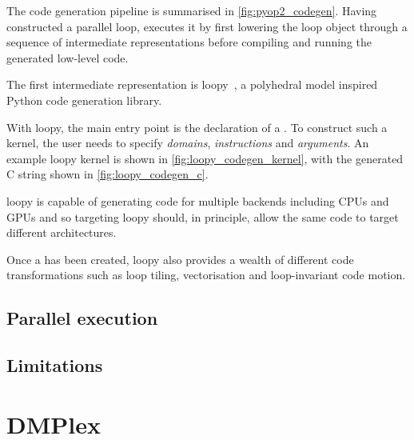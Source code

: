 \documentclass[thesis]{subfiles}
\begin{document}
The code generation pipeline is summarised in \cref{fig:pyop2_codegen}.
Having constructed a parallel loop,  executes it by first lowering the loop object through a sequence of intermediate representations before compiling and running the generated low-level code.

The first intermediate representation is loopy~\cite{klocknerLooPyTransformationbased2014}, a polyhedral model inspired Python code generation library.

With loopy, the main entry point is the declaration of a .
To construct such a kernel, the user needs to specify \textit{domains}, \textit{instructions} and \textit{arguments}.
An example loopy kernel is shown in \cref{fig:loopy_codegen_kernel}, with the generated C string shown in \cref{fig:loopy_codegen_c}.

loopy is capable of generating code for multiple backends including CPUs and GPUs and so  targeting loopy should, in principle, allow the same  code to target different architectures.

Once a  has been created, loopy also provides a wealth of different code transformations such as loop tiling, vectorisation and loop-invariant code motion.

\subsection{Parallel execution}


\subsection{Limitations}


\section{DMPlex}


\end{document}
